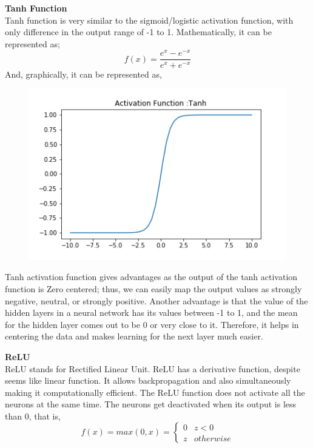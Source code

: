 \textbf{Tanh Function}\\
Tanh function is very similar to the sigmoid/logistic activation function, with only difference in the output range of -1 to 1. 
Mathematically, it can be represented as;
\begin{equation}
    f(x) = \frac{e^x - e^{-x}}{e^x + e^{-x}}
\end{equation}
And, graphically, it can be represented as,\\
\begin{figure}[H]
    \centering
    \includegraphics{Figure/Tanh.png}
    \label{fig:my_label}
\end{figure}


Tanh activation function gives advantages as the output of the tanh activation function is Zero centered; thus, we can easily map the output values as strongly negative, neutral, or strongly positive. Another advantage is that the value of the hidden layers in a neural network has its values  between -1 to 1, and the mean for the hidden layer comes out to be 0 or very close to it. Therefore, it helps in centering the data and makes learning for the next layer much easier\cite{227257}.

\textbf{ReLU} \\
ReLU stands for Rectified Linear Unit. ReLU has a derivative function, despite seems like linear function. It allows backpropagation and also simultaneously making it computationally efficient. The ReLU function does not activate all the neurons at the same time. The neurons get deactivated when its output is less than 0, that is,
\begin{equation}
    f(x) = max(0,x) = \begin{cases} 
      0 & z < 0 \\
      z & otherwise 
   \end{cases}
\end{equation}

